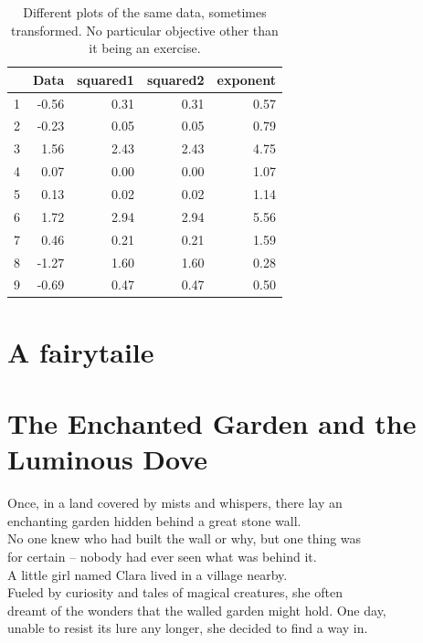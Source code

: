 \documentclass[12pt, a4paper, titlepage]{article}
\begin{document}
\vspace{0.5cm}

\begin{table}[H]
 \centering

  \caption{Different plots of the same data, sometimes transformed. No particular objective 
other than it being an exercise.}


\begin{tabular}{lrrrr}
  \hline
   & Data & squared1 & squared2 & exponent\\ 
  \hline
  1           & -0.56 & 0.31 & 0.31 & 0.57\\ 
  2           & -0.23 & 0.05 & 0.05 & 0.79\\ 
  3           & 1.56 & 2.43 & 2.43 & 4.75 \\ 
  4           & 0.07 & 0.00 & 0.00 & 1.07 \\ 
  5           & 0.13 & 0.02 & 0.02 & 1.14  \\ 
  6           & 1.72 & 2.94 & 2.94 & 5.56 \\ 
  7           & 0.46 & 0.21 & 0.21 & 1.59 \\ 
  8           & -1.27 & 1.60 & 1.60 & 0.28\\
  9           & -0.69 & 0.47 & 0.47 & 0.50\\ 
   \hline
  \end{tabular}
 \end{table}




\section{A fairytaile}
\section*{The Enchanted Garden and the Luminous Dove}

Once, in a land covered by mists and whispers, there lay an\\ 
enchanting garden hidden behind a great stone wall.\\ 
No one knew who had built the wall or why, but one thing was\\
for certain – nobody had ever seen what was behind it.\\


A little girl named Clara lived in a village nearby.\\
Fueled by curiosity and tales of magical creatures, she often\\ 
dreamt of the wonders that the walled garden might hold. One day,\\
unable to resist its lure any longer, she decided to find a way in.\\
\end{document}
